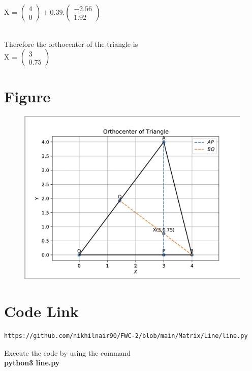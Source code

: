 \documentclass[journal,12pt,twocolumn]{IEEEtran}
\newcommand{\myvec}[1]{\ensuremath{\begin{pmatrix}#1\end{pmatrix}}}
\begin{document}
X = $\myvec{4\\0}+ 0.39. \myvec{-2.56\\1.92}$
\\
\\
\vspace{0.3cm}

Therefore the orthocenter of the triangle is
\\

X = $\myvec{3\\0.75}$
\\

\section{\textbf{Figure}}
\begin{figure}[h]
    \centering
\includegraphics[width=\columnwidth]{fig.jpg}
    \label{fig:my_label}
\end{figure}


\section{\textbf{Code Link}}

\begin{lstlisting}
https://github.com/nikhilnair90/FWC-2/blob/main/Matrix/Line/line.py
\end{lstlisting}
Execute the code by using the command\\
\textbf{python3 line.py}
\end{document}
